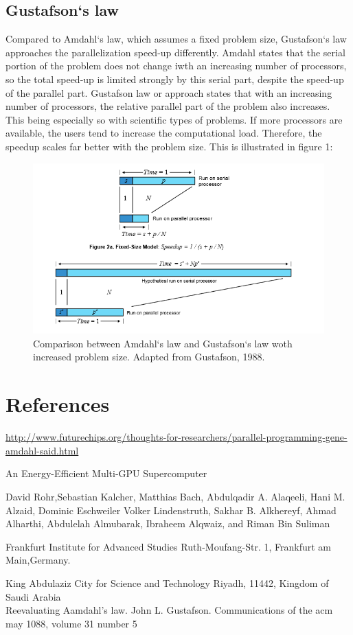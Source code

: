 \documentclass[a4paper]{article}
\begin{document}
\subsection{Gustafson`s law}
Compared to Amdahl`s law, which assumes a fixed problem size, Gustafson`s law approaches the parallelization speed-up differently. Amdahl states that the serial portion of the problem does not change iwth an increasing number of processors, so the total speed-up is limited strongly by this serial part, despite the speed-up of the parallel part.
Gustafson law or approach states that with an increasing number of processors, the relative parallel part of the problem also increases. This being especially so with scientific types of problems. If more processors are available, the users tend to increase the computational load. Therefore, the speedup scales far better with the problem size. This is illustrated in figure 1:

\begin{figure}[-ht]
\includegraphics[width=\textwidth]{Law}
\caption{Comparison between Amdahl`s law and Gustafson`s law woth increased problem size. Adapted from Gustafson, 1988.}
\end{figure}

\section{References}

\url{http://www.futurechips.org/thoughts-for-researchers/parallel-programming-gene-amdahl-said.html}

An Energy-Efficient Multi-GPU Supercomputer

David Rohr,Sebastian Kalcher, Matthias Bach, Abdulqadir A. Alaqeeli, Hani M. Alzaid, Dominic Eschweiler
Volker Lindenstruth, Sakhar B. Alkhereyf, Ahmad Alharthi, Abdulelah Almubarak, Ibraheem Alqwaiz, and Riman Bin Suliman 

Frankfurt Institute for Advanced Studies Ruth-Moufang-Str. 1, Frankfurt am Main,Germany.

King Abdulaziz City for Science and Technology Riyadh, 11442, Kingdom of Saudi Arabia
\\
Reevaluating Aamdahl’s law. John L. Gustafson. Communications of the acm may 1088, volume 31 number 5
\end{document}
